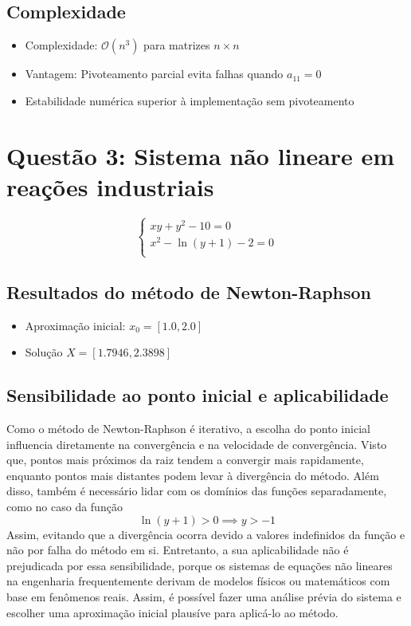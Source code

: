 \documentclass{article}
\begin{document}
\subsection*{Complexidade}
\begin{itemize}
\item Complexidade: $\mathcal{O}(n^3)$ para matrizes $n \times n$
\item Vantagem: Pivoteamento parcial evita falhas quando $a_{11} = 0$
\item Estabilidade numérica superior à implementação sem pivoteamento
\end{itemize}


\section*{Questão 3: Sistema não lineare em reações industriais}
\begin{equation}\label{eq:sistema}
\begin{cases}
xy + y^2 - 10 = 0 \\
x^2 - \ln(y+1) - 2 = 0 \\
\end{cases}
\end{equation}

\subsection*{Resultados do método de Newton-Raphson}



\begin{itemize}
\item Aproximação inicial: $x_0 = [1.0, 2.0]$
\item Solução $X =[1.7946, 2.3898]$
\end{itemize}
\subsection*{Sensibilidade ao ponto inicial e aplicabilidade}
Como o método de Newton-Raphson é iterativo, a escolha do ponto inicial influencia diretamente na convergência e na velocidade de convergência. Visto que, pontos mais próximos da raiz tendem a convergir mais rapidamente, 
enquanto pontos mais distantes podem levar à divergência do método.
Além disso, também é necessário lidar com os domínios das funções separadamente, como no caso da função \begin{equation*}\ln(y+1) > 0 \implies y > -1\end{equation*} 
Assim, evitando que a divergência ocorra devido a valores indefinidos da função e não por falha do método em si. Entretanto, a sua aplicabilidade não é prejudicada por essa sensibilidade, porque os sistemas de equações não lineares na engenharia 
frequentemente derivam de modelos físicos ou matemáticos com base em fenômenos reais. Assim, é possível fazer uma análise prévia do sistema e escolher uma aproximação inicial plausíve para aplicá-lo ao método.
\end{document}
